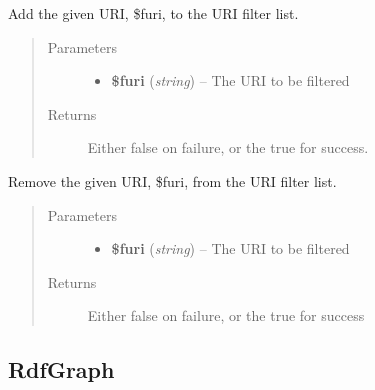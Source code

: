 \documentclass[letterpaper,10pt,english]{sphinxmanual}
\begin{document}
\begin{fulllineitems}
\begin{fulllineitems}
\label{docs/api:Extractor::addFilteredUri}
Add the given URI, \$furi, to the URI filter list.
\begin{quote}\begin{description}
\item[{Parameters}] \leavevmode\begin{itemize}
\item {} 
\textbf{\$furi} (\emph{string}) -- The URI to be filtered

\end{itemize}

\item[{Returns}] \leavevmode
Either false on failure, or the true for success.

\end{description}\end{quote}

\end{fulllineitems}


\begin{fulllineitems}
\label{docs/api:Extractor::removeFilteredUri}
Remove the given URI, \$furi, from the URI filter list.
\begin{quote}\begin{description}
\item[{Parameters}] \leavevmode\begin{itemize}
\item {} 
\textbf{\$furi} (\emph{string}) -- The URI to be filtered

\end{itemize}

\item[{Returns}] \leavevmode
Either false on failure, or the true for success

\end{description}\end{quote}

\end{fulllineitems}


\end{fulllineitems}



\subsection{RdfGraph}
\label{docs/api:rdfgraph}
\end{document}
